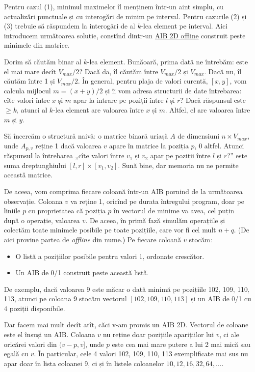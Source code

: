 Pentru cazul (1), minimul maximelor îl menținem într-un aint simplu, cu actualizări punctuale și cu interogări de minim pe interval. Pentru cazurile (2) și (3) trebuie să răspundem la interogări de al $k$-lea element pe interval. Aici introducem următoarea soluție, constînd dintr-un \href{https://usaco.guide/plat/2DRQ?lang=cpp#offline-2d-bit}{AIB 2D offline} construit peste minimele din matrice.

Dorim să căutăm binar al $k$-lea element. Bunăoară, prima dată ne întrebăm: este el mai mare decît $V_{max} / 2$? Dacă da, îl căutăm între $V_{max} / 2$ și $V_{max}$. Dacă nu, îl căutăm între 1 și $V_{max} / 2$. În general, pentru plaja de valori curentă, $[x, y]$, vom calcula mijlocul $m = (x + y) / 2$ și îi vom adresa structurii de date întrebarea: cîte valori între $x$ și $m$ apar la intrare pe poziții între $l$ și $r$? Dacă răspunsul este $\geq k$, atunci al $k$-lea element are valoarea între $x$ și $m$. Altfel, el are valoarea între $m$ și $y$.

Să încercăm o structură naivă: o matrice binară uriașă $A$ de dimensiuni $n \times V_{max}$, unde $A_{p,v}$ reține 1 dacă valoarea $v$ apare în matrice la poziția $p$, 0 altfel. Atunci răspunsul la întrebarea „cîte valori între $v_1$ și $v_2$ apar pe poziții între $l$ și $r$?” este suma dreptunghiului $[l, r] \times [v_1, v_2]$. Sună bine, dar memoria nu ne permite această matrice.

De aceea, vom comprima fiecare coloană într-un AIB pornind de la următoarea observație. Coloana $v$ va reține 1, oricînd pe durata întregului program, doar pe liniile $p$ cu proprietatea că poziția $p$ în vectorul de minime va avea, cel puțin după o operație, valoarea $v$. De aceea, în primă fază simulăm operațiile și colectăm toate minimele posibile pe toate pozițiile, care vor fi cel mult $n + q$. (De aici provine partea de \textit{offline} din nume.) Pe fiecare coloană $v$ stocăm:

\begin{itemize}
  \item O listă a pozițiilor posibile pentru valori 1, ordonate crescător.
  \item Un AIB de 0/1 construit peste această listă.
\end{itemize}

De exemplu, dacă valoarea $9$ este măcar o dată minimă pe pozițiile 102, 109, 110, 113, atunci pe coloana 9 stocăm vectorul $[102, 109, 110, 113]$ și un AIB de 0/1 cu 4 poziții disponibile.

Dar facem mai mult decît atît, căci v-am promis un AIB 2D.  Vectorul de coloane este el însuși un AIB. Coloana $v$ nu reține doar pozițiile aparițiilor lui $v$, ci ale oricărei valori din $(v - p, v]$, unde $p$ este cea mai mare putere a lui 2 mai mică sau egală cu $v$. În particular, cele 4 valori 102, 109, 110, 113 exemplificate mai sus nu apar doar în lista coloanei 9, ci și în listele coloanelor $10, 12, 16, 32, 64, \dots$.

